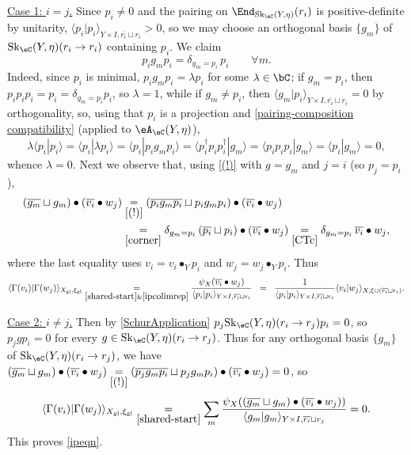 \documentclass[12pt,reqno]{amsart}
\newcommand{\glu}{\mathrm{gl}}
\newcommand{\Sk}{\mathrm{Sk}}
\newcommand{\A}{\eA}
\newcommand{\C}{\eC}
\newcommand{\blt}{\bullet}
\newcommand{\fcj}[1]{\overline{#1}}
\newcommand{\bkt}[2]{\langle #1|#2 \rangle}
\newcommand{\itemstep}[1]{\smallskip\noindent\underline{#1}}
\renewcommand{\amalg}{\sqcup}
\begin{document}
\begin{pf}
\itemstep{Case 1: $i=j$.} Since $p_i\neq0$ and the pairing on $\End_{\Sk_\C(Y,\eta)}(r_i)$ is positive-definite by unitarity, $\bkt{p_i}{p_i}_{Y\times I,\fcj{r_i}\amalg r_i}>0$, so we may choose an orthogonal basis $\{g_m\}$ of $\Sk_\C(Y,\eta)(r_i\to r_i)$ containing $p_i$. We claim
\begin{equation}
\label{corner}
p_i g_m p_i = \delta_{g_m=p_i}\, p_i\qquad\forall m.
\end{equation}
Indeed, since $p_i$ is minimal, $p_ig_mp_i=\lambda p_i$ for some $\lambda\in\bC$; if $g_m = p_i$, then $p_i p_i p_i = p_i=\delta_{g_m=p_i} p_i$, so $\lambda=1$, while if $g_m\neq p_i$, then $\bkt{g_m}{p_i}_{Y\times I,\fcj{r_i}\amalg r_i} = 0$ by orthogonality, so, using that $p_i$ is a projection and \cref{pairing-composition compatibility} (applied to $\A_\C(Y,\eta)$),
\[
\lambda\bkt{p_i}{p_i}=\bkt{p_i}{\lambda p_i}
=
\bkt{p_i}{p_i g_m p_i}
=
\bkt{p_i^\dag p_i p_i^\dag}{g_m}
=
\bkt{p_i p_i p_i}{g_m}
=
\bkt{p_i}{g_m} = 0,
\]
whence $\lambda=0$.
Next we observe that, using \eqref{(!)} with $g=g_m$ and $j=i$ (so $p_j=p_i$),
\begin{equation}
\label{ipcolimrep}
\begin{aligned}
(\fcj{g_m}\amalg g_m) \bullet (\fcj{v_i}\bullet w_j)
&
\underset{\eqref{(!)}}{=}
(\fcj{p_i g_m p_i}\amalg p_i g_m p_i) \bullet (\fcj{v_i}\bullet w_j )
\\&
\underset{\eqref{corner}}{=}
\delta_{g_m=p_i}\,
(\fcj{p_i}\amalg p_i) \bullet (\fcj{v_i}\bullet w_j )
\underset{\ref{CTc}}{=}\delta_{g_m=p_i}\,\fcj{v_i}\blt w_j,
\end{aligned}
\end{equation}
where the last equality uses $v_i=v_i\blt_Yp_i$ and $w_j=w_j\blt_Yp_i$. Thus
\[
\bkt{\Gamma(v_i)}{\Gamma(w_j)}_{X_{\glu}, \xi_{\glu}}
\underset{\eqref{shared-start}\&\eqref{ipcolimrep}}{=}
\frac{ \psi_{X}(\fcj{v_i}\bullet w_j) }{ \bkt{p_i}{p_i}_{Y\times I,\fcj{r_i}\amalg r_i}}
\;\;=\;\;
\frac{1}{\bkt{p_i}{p_i}_{Y\times I,\fcj{r_i}\amalg r_i}} \bkt{v_i}{w_j}_{X,\xi\cup(\fcj{r_i}\amalg r_i)}.
\]
 
\itemstep{Case 2: $i\neq j$.} Then by \eqref{SchurApplication} $p_j\Sk_\C(Y,\eta)(r_i\to r_j)p_i=0$, so $p_jgp_i=0$ for every $g\in\Sk_\C(Y,\eta)(r_i\to r_j)$. Thus for any orthogonal basis $\{g_m\}$ of $\Sk_\C(Y,\eta)(r_i\to r_j)$, we have $(\fcj{g_m}\amalg g_m) \bullet (\fcj{v_i}\bullet w_j)\underset{\eqref{(!)}}{=}(\fcj{p_j g_m p_i}\amalg p_j g_m p_i) \bullet (\fcj{v_i}\bullet w_j )=0$, so
\[
\bkt{\Gamma(v_i)}{\Gamma(w_j)}_{X_{\glu}, \xi_{\glu}}
\underset{\eqref{shared-start}}{=}
\sum_m \frac{ \psi_{X}((\fcj{g_m}\amalg g_m) \bullet (\fcj{v_i}\bullet w_j )) }{ \bkt{g_m}{g_m}_{Y\times I,\fcj{r_i}\amalg r_j}}
=0.
\]
This proves \eqref{ipeqn}.
\end{pf}
\end{document}
